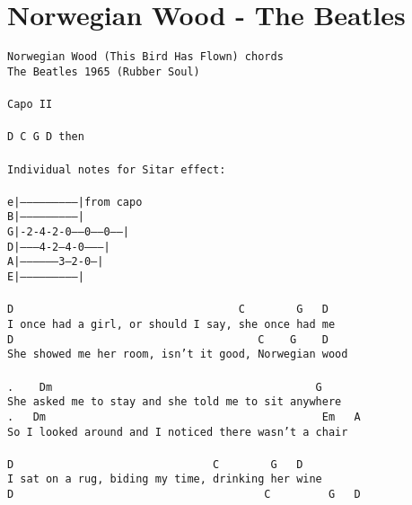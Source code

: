 \newpage
\section{Norwegian Wood - The Beatles}
\label{Norwegian Wood - The Beatles}
\texttt{Norwegian\ Wood\ (This\ Bird\ Has\ Flown)\ chords\\
The\ Beatles\ 1965\ (Rubber\ Soul)\\
\\
Capo\ II\\
\\
D\ C\ G\ D\ then\\
\\
Individual\ notes\ for\ Sitar\ effect:\\
\\
e|--------------------------|from\ capo\\
B|--------------------------|\\
G|-2-4-2-0-----0------0-----|\\
D|---------4-2---4-0--------|\\
A|------------------3--2-0--|\\
E|--------------------------|\ \\
\\
D\ \ \ \ \ \ \ \ \ \ \ \ \ \ \ \ \ \ \ \ \ \ \ \ \ \ \ \ \ \ \ \ \ \ \ C\ \ \ \ \ \ \ \ G\ \ \ D\\
I\ once\ had\ a\ girl,\ or\ should\ I\ say,\ she\ once\ had\ me\\
D\ \ \ \ \ \ \ \ \ \ \ \ \ \ \ \ \ \ \ \ \ \ \ \ \ \ \ \ \ \ \ \ \ \ \ \ \ \ C\ \ \ \ G\ \ \ \ D\\
She\ showed\ me\ her\ room,\ isn't\ it\ good,\ Norwegian\ wood\\
\\
. \ \ \ Dm\ \ \ \ \ \ \ \ \ \ \ \ \ \ \ \ \ \ \ \ \ \ \ \ \ \ \ \ \ \ \ \ \ \ \ \ \ \ \ \ \ G\\
She\ asked\ me\ to\ stay\ and\ she\ told\ me\ to\ sit\ anywhere\\
. \ \ Dm\ \ \ \ \ \ \ \ \ \ \ \ \ \ \ \ \ \ \ \ \ \ \ \ \ \ \ \ \ \ \ \ \ \ \ \ \ \ \ \ \ \ \ Em\ \ \ A\\
So\ I\ looked\ around\ and\ I\ noticed\ there\ wasn't\ a\ chair\\
\\
D\ \ \ \ \ \ \ \ \ \ \ \ \ \ \ \ \ \ \ \ \ \ \ \ \ \ \ \ \ \ \ C\ \ \ \ \ \ \ \ G\ \ \ D\\
I\ sat\ on\ a\ rug,\ biding\ my\ time,\ drinking\ her\ wine\\
D\ \ \ \ \ \ \ \ \ \ \ \ \ \ \ \ \ \ \ \ \ \ \ \ \ \ \ \ \ \ \ \ \ \ \ \ \ \ \ C\ \ \ \ \ \ \ \ \ G\ \ \ D\\
}
